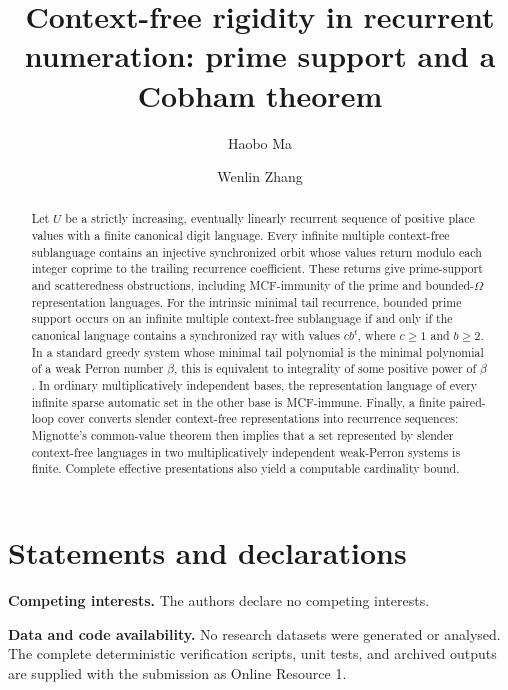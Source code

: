 \documentclass[11pt,a4paper]{amsart}
\title[Context-free rigidity in recurrent numeration]{Context-free rigidity in recurrent numeration: prime support and a Cobham theorem}
\author{Haobo Ma}
\author{Wenlin Zhang}
\date{}
\begin{document}
\begin{abstract}
Let \(U\) be a strictly increasing, eventually linearly recurrent sequence
of positive place values with a finite canonical digit language. Every
infinite multiple context-free sublanguage contains an injective
synchronized orbit whose values return modulo each integer coprime to the
trailing recurrence coefficient. These returns give prime-support and
scatteredness obstructions, including MCF-immunity of the prime and
bounded-\(\Omega\) representation languages. For the intrinsic minimal
tail recurrence, bounded prime support occurs on an infinite
multiple context-free sublanguage if and only if the canonical language
contains a synchronized ray with values \(cb^t\), where \(c\ge1\) and
\(b\ge2\). In a standard greedy system whose minimal tail polynomial is
the minimal polynomial of a weak Perron number \(\beta\), this is equivalent
to integrality of some positive power of \(\beta\). In ordinary
multiplicatively independent bases, the representation language of every
infinite sparse automatic set in the other base is MCF-immune. Finally, a finite
paired-loop cover converts slender context-free representations into
recurrence sequences: Mignotte's common-value theorem then implies that a
set represented by slender context-free languages in two multiplicatively
independent weak-Perron systems is finite. Complete effective presentations
also yield a computable cardinality bound.
\end{abstract}


\maketitle






\section*{Statements and declarations}

\textbf{Competing interests.} The authors declare no competing interests.

\textbf{Data and code availability.} No research datasets were generated or
analysed. The complete deterministic verification scripts, unit tests, and
archived outputs are supplied with the submission as Online Resource 1.


\end{document}
